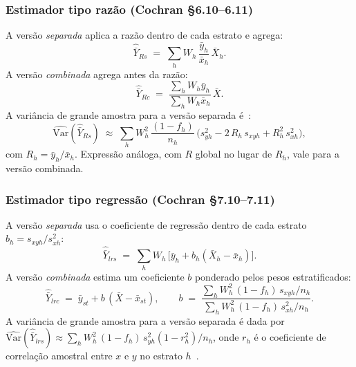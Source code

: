 \subsubsection{Estimador tipo razão (Cochran §6.10--6.11)}

A versão \emph{separada} aplica a razão dentro de cada estrato e agrega:
\begin{equation}
  \hat{\bar{Y}}_{Rs} \;=\; \sum_{h} W_h\, \frac{\bar{y}_h}{\bar{x}_h}\, \bar{X}_h.
  \label{eq:ratio-sep}
\end{equation}
A versão \emph{combinada} agrega antes da razão:
\begin{equation}
  \hat{\bar{Y}}_{Rc} \;=\; \frac{\sum_h W_h \bar{y}_h}{\sum_h W_h \bar{x}_h}\,\bar{X}.
  \label{eq:ratio-comb}
\end{equation}
A variância de grande amostra para a versão separada é~\cite{cochran1977}:
\begin{equation}
  \widehat{\mathrm{Var}}(\hat{\bar{Y}}_{Rs}) \;\approx\;
   \sum_{h} W_h^{2}\,\frac{(1 - f_h)}{n_h}\,
     \bigl(s_{yh}^{2} - 2\,R_h\,s_{xyh} + R_h^{2}\,s_{xh}^{2}\bigr),
  \label{eq:ratio-var}
\end{equation}
com $R_h = \bar{y}_h / \bar{x}_h$. Expressão análoga, com $R$ global no lugar
de $R_h$, vale para a versão combinada.

\subsubsection{Estimador tipo regressão (Cochran §7.10--7.11)}

A versão \emph{separada} usa o coeficiente de regressão dentro de cada estrato
$b_h = s_{xyh}/s_{xh}^{2}$:
\begin{equation}
  \hat{\bar{Y}}_{lrs} \;=\; \sum_{h} W_h\,\bigl[\bar{y}_h + b_h(\bar{X}_h - \bar{x}_h)\bigr].
  \label{eq:reg-sep}
\end{equation}
A versão \emph{combinada} estima um coeficiente $b$ ponderado pelos pesos
estratificados:
\begin{equation}
  \hat{\bar{Y}}_{lrc} \;=\; \bar{y}_{st} + b\,(\bar{X} - \bar{x}_{st}),
  \qquad
  b \;=\;
   \frac{\sum_h W_h^{2}\,(1-f_h)\,s_{xyh}/n_h}
        {\sum_h W_h^{2}\,(1-f_h)\,s_{xh}^{2}/n_h}.
  \label{eq:reg-comb}
\end{equation}
A variância de grande amostra para a versão separada é dada por
$\widehat{\mathrm{Var}}(\hat{\bar{Y}}_{lrs}) \approx \sum_h W_h^{2}\,(1-f_h)\,
s_{yh}^{2}(1-r_h^{2})/n_h$, onde $r_h$ é o coeficiente de correlação amostral
entre $x$ e $y$ no estrato $h$~\cite{cochran1977,lohr1999}.

